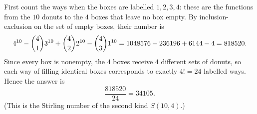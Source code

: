 First count the ways when the boxes are labelled $1,2,3,4$: these are the functions from the $10$ donuts to the $4$ boxes that leave no box empty. By inclusion-exclusion on the set of empty boxes, their number is
\[4^{10}-\dbinom41 3^{10}+\dbinom42 2^{10}-\dbinom43 1^{10}=1048576-236196+6144-4=818520.\]
Since every box is nonempty, the $4$ boxes receive $4$ different sets of donuts, so each way of filling identical boxes corresponds to exactly $4!=24$ labelled ways. Hence the answer is
\[\dfrac{818520}{24}=\boxed{34105}.\]
(This is the Stirling number of the second kind $S(10,4)$.)

